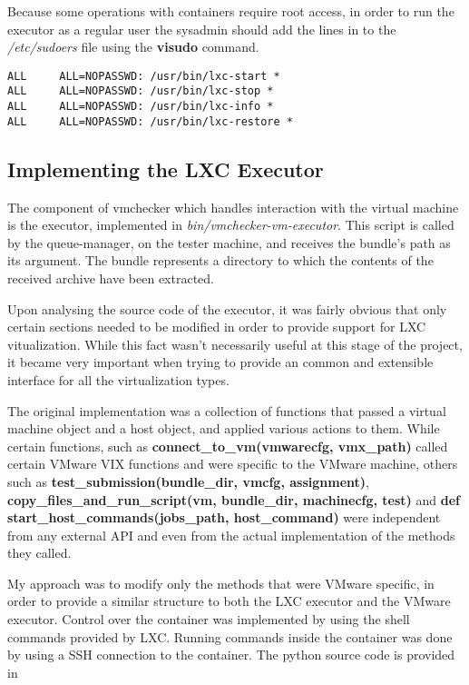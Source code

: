 Because some operations with containers require root access, in order to
run the executor as a regular user the sysadmin should add the lines in 
 to the \textit{/etc/sudoers} file 
using the \textbf{visudo} command.

\lstset{caption=Uninteractive Sudo Permission,label=lst:etc-sudoers}
\begin{lstlisting}
ALL     ALL=NOPASSWD: /usr/bin/lxc-start *
ALL     ALL=NOPASSWD: /usr/bin/lxc-stop *
ALL     ALL=NOPASSWD: /usr/bin/lxc-info *
ALL     ALL=NOPASSWD: /usr/bin/lxc-restore *
\end{lstlisting}


\subsection{Implementing the LXC Executor}
\label{sub-sec:vmc-lxc-executor}

The component of vmchecker which handles interaction with the virtual machine 
is the executor, implemented in \textit{bin/vmchecker-vm-executor}. This script
is called by the queue-manager, on the tester machine, and receives the bundle's
path as its argument. The bundle represents a directory to which the contents
of the received archive have been extracted.

Upon analysing the source code of the executor, it was fairly obvious that
only certain sections needed to be modified in order to provide support for
LXC vitualization. While this fact wasn't necessarily useful at this stage
of the project, it became very important when trying to provide an common and
extensible interface for all the virtualization types.

The original implementation was a collection of functions that passed a 
virtual machine object and a host object, and applied various actions to them.
While certain functions, such as \textbf{connect_to_vm(vmwarecfg, vmx_path)}
called certain VMware VIX functions and were specific to the VMware machine,
others such as \textbf{test_submission(bundle_dir, vmcfg, assignment)}, 
\textbf{copy_files_and_run_script(vm, bundle_dir, machinecfg, test)} and 
\textbf{def start_host_commands(jobs_path, host_command)} were independent
from any external API and even from the actual implementation of the 
methods they called.

My approach was to modify only the methods that were VMware specific, in order
to provide a similar structure to both the LXC executor and the VMware executor.
Control over the container was implemented by using the shell commands
provided by LXC. Running commands inside the container was done by using a 
SSH connection to the container. The python source code is 
provided in 


